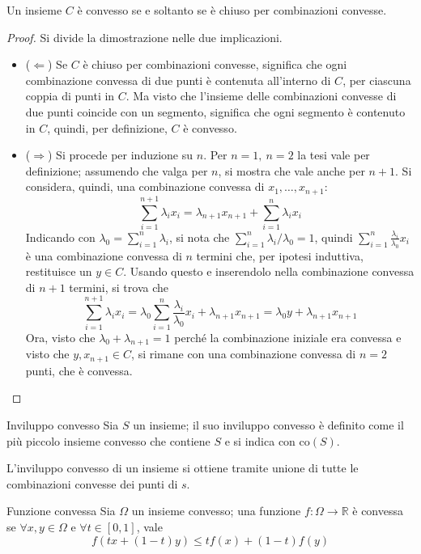\documentclass[11pt, a4paper]{scrartcl}
\theoremstyle{definition}
\numberwithin{esempio}{section}
\theoremstyle{definition}
\numberwithin{obs}{section}
\numberwithin{nota}{section}
\numberwithin{equation}{subsection}
\begin{document}
\begin{prop}
	{}{}
	Un insieme $C$ \`e convesso se e soltanto se \`e chiuso per combinazioni convesse.
	\begin{proof}
			Si divide la dimostrazione nelle due implicazioni.
		\begin{itemize}
			\item ($\Leftarrow $) Se $C$ \`e chiuso per combinazioni convesse, significa che ogni combinazione convessa di due punti \`e contenuta all'interno di $C$, per ciascuna coppia di punti in $C$. 
				Ma visto che l'insieme delle combinazioni convesse di due punti coincide con un segmento, significa che ogni segmento \`e contenuto in $C$, quindi, per definizione, $C$ \`e convesso.
			\item ($\Rightarrow $) Si procede per induzione su $n$. Per $n=1, \ n=2$ la tesi vale per definizione; assumendo che valga per $n$, si mostra che vale anche per $n+1$.
				Si considera, quindi, una combinazione convessa di $x_1,\ldots,x_{n+1} $:
				\[
				\sum_{i=1}^{n+1} \lambda _i x_i = \lambda _{n+1} x_{n+1}+ \sum_{i=1}^{n} \lambda _i x_i
				\] 
				Indicando con $\lambda_0 = \sum_{i=1}^{n} \lambda _i$, si nota che $\sum_{i=1}^{n} \lambda _i / \lambda _0 = 1$, quindi $\sum_{i=1}^{n} \frac{\lambda _i}{\lambda _0}x_i$ \`e una combinazione convessa di $n$ termini che, per ipotesi induttiva, restituisce un $y \in C$.
				Usando questo e inserendolo nella combinazione convessa di $n+1$ termini, si trova che
				\[
				\sum_{i=1}^{n+1} \lambda _i x_i = \lambda _0 \sum_{i=1}^{n} \frac{\lambda _i}{\lambda _0} x_i + \lambda _{n+1} x_{n+1} = \lambda _0 y + \lambda _{n+1} x_{n+1} 
				\] 
			Ora, visto che $\lambda _0 + \lambda _{n+1} =1$ perch\'e la combinazione iniziale era convessa e visto che $y,x_{n+1} \in C$, si rimane con una combinazione convessa di $n=2$ punti, che \`e convessa.
		\end{itemize}
	\end{proof}
\end{prop}
\begin{definizione}
	{Inviluppo convesso}{}
	Sia $S$ un insieme; il suo inviluppo convesso \`e definito come il pi\`u piccolo insieme convesso che contiene $S$ e si indica con $\mathrm{co} (S)$.
\end{definizione}
\noindent L'inviluppo convesso di un insieme si ottiene tramite unione di tutte le combinazioni convesse dei punti di $s$.
\begin{definizione}
	{Funzione convessa}{}
	Sia $\Omega $ un insieme convesso; una funzione $f:\Omega \to \mathbb{R}$ \`e convessa se $\forall x,y \in \Omega $ e $\forall t \in [0,1]$, vale
	\[
	f(tx + (1-t)y)\le tf(x) +(1-t)f(y)
	\] 
\end{definizione}
\end{document}
